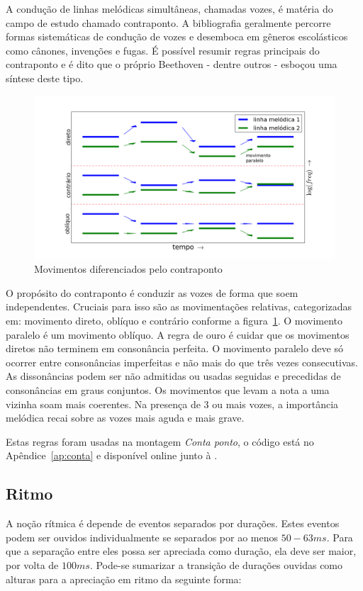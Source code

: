 A condução de linhas melódicas simultâneas, chamadas vozes,
é matéria do campo de estudo chamado contraponto. A bibliografia
geralmente percorre formas sistemáticas de condução de vozes e desemboca em gêneros escolásticos como cânones, invenções e fugas. É possível resumir regras principais do contraponto e é dito que o próprio Beethoven - dentre outros - esboçou uma síntese deste tipo.

\begin{figure}[h!]
    \centering
        \includegraphics[width=\textwidth]{figuras/movContraponto}
    \caption{Movimentos diferenciados pelo contraponto}
        \label{fig:movContraponto}
\end{figure}



O propósito do contraponto é conduzir as vozes 
de forma que soem independentes. Cruciais para isso
são as movimentações relativas,
categorizadas em: movimento direto, oblíquo e contrário
conforme a figura~\ref{fig:movContraponto}. O movimento paralelo
é um movimento oblíquo.
A regra de ouro é cuidar que os movimentos diretos
não terminem em consonância perfeita. O movimento paralelo
deve só ocorrer entre consonâncias imperfeitas e não mais
do que três vezes consecutivas. As dissonâncias podem
ser não admitidas ou usadas seguidas 
e precedidas de consonâncias em graus conjuntos.
Os movimentos que levam a nota a uma vizinha soam mais coerentes.
Na presença de 3 ou mais vozes,
a importância melódica recai sobre as vozes mais aguda e mais grave.\cite{Fux,Tragtenberg,SchoenbergContra}

Estas regras foram usadas na montagem \emph{Conta ponto}, o código está no Apêndice~\ref{ap:conta} e disponível online junto à \massa.


\subsection{Ritmo}
A noção rítmica é depende de eventos separados por durações.\cite{rythm} Estes eventos podem ser ouvidos individualmente se separados
por ao menos $50-63ms$. Para que a separação entre eles possa ser apreciada como duração, ela deve ser maior,
por volta de $100ms$.\cite{microsound} Pode-se sumarizar 
a transição
de durações ouvidas como alturas para a apreciação em ritmo da seguinte forma:\cite{Alfaix, microsound}

